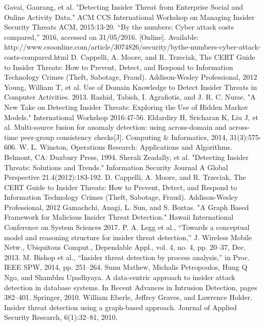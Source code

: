 \documentclass[conference]{IEEEtran}
\begin{document}
\begin{thebibliography}{00}
Gavai, Gaurang, et al. "Detecting Insider Threat from Enterprise Social and Online Activity Data." ACM CCS International Workshop on Managing Insider Security Threats ACM, 2015:13-20.
 “By the numbers: Cyber attack costs compared,” 2016, accessed on 31/05/2016. [Online]. Available: http://www.csoonline.com/article/3074826/security/bythe-numbers-cyber-attack-costs-compared.html
  D. Cappelli, A. Moore, and R. Trzeciak, The CERT Guide to Insider Threats: How to Prevent, Detect, and Respond to Information Technology Crimes (Theft, Sabotage, Fraud). Addison-Wesley Professional, 2012
 Young, William T, et al. Use of Domain Knowledge to Detect Insider Threats in Computer Activities.  2013.
 Rashid, Tabish, I. Agrafiotis, and J. R. C. Nurse. "A New Take on Detecting Insider Threats: Exploring the Use of Hidden Markov Models." International Workshop 2016:47-56.
Eldardiry H, Sricharan K, Liu J, et al. Multi-source fusion for anomaly detection: using across-domain and across-time peer-group consistency checks[J]. Computing \& Informatics, 2014, 31(3):575-606.
W. L. Winston, Operations Research: Applications and Algorithms. Belmont, CA: Duxbury Press, 1994.
 Sherali   Zeadally, et al. "Detecting Insider Threats: Solutions and Trends." Information Security Journal A Global Perspective 21.4(2012):183-192.
  D. Cappelli, A. Moore, and R. Trzeciak, The CERT Guide to Insider Threats: How to Prevent, Detect, and Respond
to Information Technology Crimes (Theft, Sabotage, Fraud). Addison-Wesley Professional, 2012
 Gamachchi, Anagi, L. Sun, and S. Boztas. "A Graph Based Framework for Malicious Insider Threat Detection." Hawaii International Conference on System Sciences 2017.
  P. A. Legg et al., “Towards a conceptual model and reasoning structure for insider threat detection,” J. Wireless Mobile Netw., Ubiquitous Comput., Dependable Appl., vol. 4, no. 4, pp. 20–37, Dec. 2013.
 M. Bishop et al., “Insider threat detection by process analysis,” in Proc. IEEE SPW, 2014, pp. 251–264.
 Sunu Mathew, Michalis Petropoulos, Hung Q Ngo, and Shambhu Upadhyaya. A data-centric approach to insider attack detection in database systems. In Recent Advances in Intrusion Detection, pages 382–401. Springer, 2010.
 William Eberle, Jeffrey Graves, and Lawrence Holder. Insider threat detection using a graph-based approach. Journal of Applied Security Research, 6(1):32–81, 2010.

\end{thebibliography}
\end{document}
